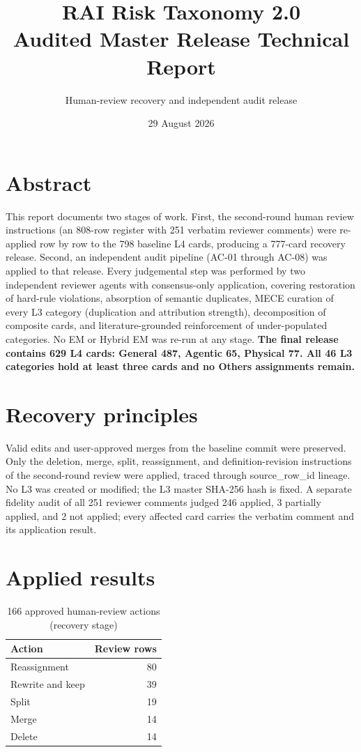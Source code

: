 \documentclass[11pt,a4paper]{article}
\begin{document}
\title{RAI Risk Taxonomy 2.0\\Audited Master Release Technical Report}\author{Human-review recovery and independent audit release}\date{29 August 2026}\maketitle
\par\section*{Abstract}
This report documents two stages of work. First, the second-round human review instructions (an 808-row register with 251 verbatim reviewer comments) were re-applied row by row to the 798 baseline L4 cards, producing a 777-card recovery release. Second, an independent audit pipeline (AC-01 through AC-08) was applied to that release. Every judgemental step was performed by two independent reviewer agents with consensus-only application, covering restoration of hard-rule violations, absorption of semantic duplicates, MECE curation of every L3 category (duplication and attribution strength), decomposition of composite cards, and literature-grounded reinforcement of under-populated categories. No EM or Hybrid EM was re-run at any stage. \textbf{The final release contains 629 L4 cards: General 487, Agentic 65, Physical 77. All 46 L3 categories hold at least three cards and no Others assignments remain.}
\par\section{Recovery principles}
Valid edits and user-approved merges from the baseline commit were preserved. Only the deletion, merge, split, reassignment, and definition-revision instructions of the second-round review were applied, traced through source\_row\_id lineage. No L3 was created or modified; the L3 master SHA-256 hash is fixed. A separate fidelity audit of all 251 reviewer comments judged 246 applied, 3 partially applied, and 2 not applied; every affected card carries the verbatim comment and its application result.
\par\section{Applied results}
\begin{table}[h]\centering\begin{tabular}{lr}\toprule Action & Review rows\\\midrule Reassignment & 80\\Rewrite and keep & 39\\Split & 19\\Merge & 14\\Delete & 14\\\bottomrule\end{tabular}\caption{166 approved human-review actions (recovery stage)}\end{table}
\end{document}

